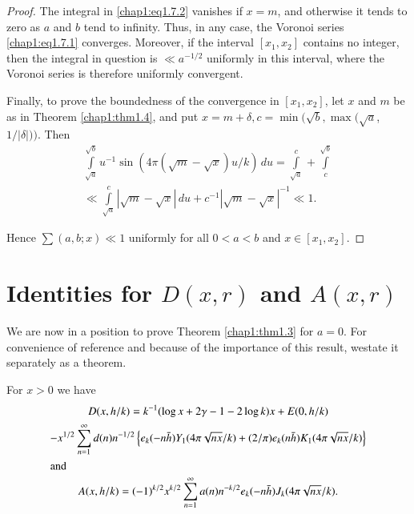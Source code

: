 \begin{proof}
The integral in \eqref{chap1:eq1.7.2} vanishes if $x=m$, and otherwise
it tends to zero as $a$ and $b$ tend to infinity. Thus, in any case,
the Voronoi series \eqref{chap1:eq1.7.1} converges. Moreover, if the
interval $[x_1,x_2]$ contains no integer, then the integral in
question is $\ll a^{-1/2}$ uniformly in this interval, where the
Voronoi series is therefore uniformly convergent.

Finally, to prove the boundedness of the convergence in $[x_1,x_2]$,
let $x$ and $m$ be as in Theorem \ref{chap1:thm1.4}, and put
$x=m+\delta, c=\min(\sqrt{b},\max(\sqrt{a}$, $1/|\delta|))$. Then 
\begin{gather*}
\int\limits_{\sqrt{a}}^{\sqrt{b}}u^{-1}\sin(4\pi(\sqrt{m}-\sqrt{x})u/k)
\,du=\int\limits_{\sqrt{a}}^c+\int\limits_c^{\sqrt{b}}\\
\ll \int\limits_{\sqrt{a}}^c|\sqrt{m}-\sqrt{x}|\,du+c^{-1}|\sqrt{m}-
\sqrt{x}|^{-1}\ll 1.
\end{gather*}

Hence $\sum(a,b;x)\ll 1$ uniformly for all $0<a<b$ and
$x\in[x_1,x_2]$. 
\end{proof}

\section{Identities for $D(x,r)$ and $A(x,r)$}\label{chap1:sec1.8} 

We are now in a position to prove Theorem \ref{chap1:thm1.3} for
$a=0$. For convenience of reference and because of the importance of
this result, we\pageoriginale state it separately as a theorem. 

\begin{THM}\label{chap1:thm1.6}
For $x>0$ we have 
\begin{gather}
D(x,h/k)=k^{-1}(\log x+2\gamma-1-2\log
k)x+E(0,h/k)\label{chap1:eq1.8.1}\\
-x^{1/2}\sum\limits_{n=1}^\infty d(n)n^{-1/2}\left\{e_k(-n\bar{h})Y_1
(4\pi\sqrt{nx}/k)+(2/\pi)e_k(n\bar{h})K_1(4\pi\sqrt{nx}/k)\right\}\notag\\
\intertext{and}
A(x,h/k)=(-1)^{k/2}x^{k/2}\sum\limits_{n=1}^\infty
a(n)n^{-k/2}e_k(-n\bar{h})J_k(4\pi\sqrt{nx}/k).\label{chap1:eq1.8.2}
\end{gather}
\end{THM}

